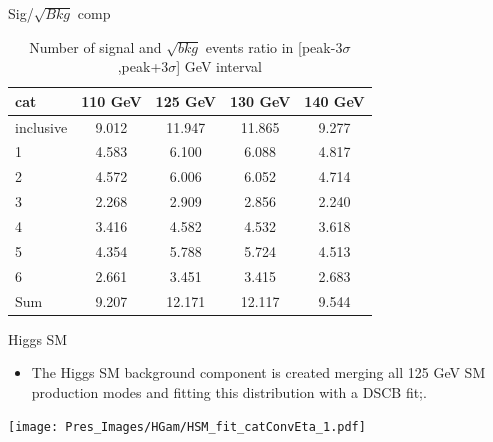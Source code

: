 \documentclass[10pt,UKenglish, leqno, xcolor = dvipsnames]{beamer}
\begin{document}
		\begin{frame}{Sig/$\sqrt{Bkg}$ comp}
		\vfill
		\begin{table}[tbp]
			\centering
			\begin{tabular}{lcccc}
				\toprule[1.5pt]
				cat & 110 GeV	& 125 GeV	& 130 GeV	& 140 GeV	\\
				\midrule
				inclusive & 9.012 & 11.947 & 11.865 & 9.277 	\\ 
				1 & 4.583 & 6.100 & 6.088 & 4.817 	\\
				2 & 4.572 & 6.006 & 6.052 & 4.714 	\\
				3 & 2.268 & 2.909 & 2.856 & 2.240 	\\
				4 & 3.416 & 4.582 & 4.532 & 3.618 	\\
				5 & 4.354 & 5.788 & 5.724 & 4.513 	\\
				6 & 2.661 & 3.451 & 3.415 & 2.683 	\\
				Sum & 9.207 & 12.171 & 12.117 & 9.544	\\
				\bottomrule[1.5pt]
			\end{tabular}
			\caption{Number of signal and $\sqrt{bkg}$ events ratio in [peak-3$\sigma$,peak+3$\sigma$] GeV interval}
		\end{table}
		\vfill
	\end{frame}

	\begin{frame}{Higgs SM}
		\vfill
		\begin{itemize}
			\item The Higgs SM background component is created merging all 125 GeV SM production modes and fitting this distribution with a DSCB fit;.
		\end{itemize}
		\begin{center}
			\texttt{[image: Pres\_Images/HGam/HSM\_fit\_catConvEta\_1.pdf]}
		\end{center}
		\vfill
	\end{frame}
	
\end{document}

